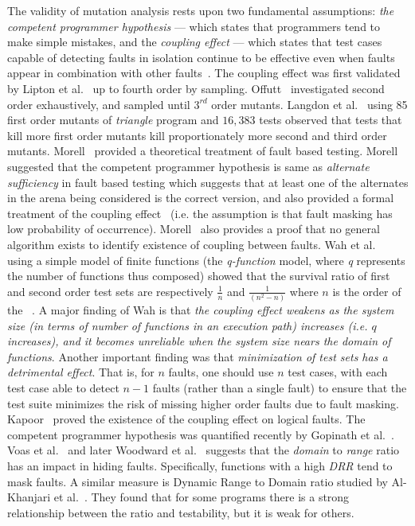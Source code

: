 \documentclass[preprint,nonatbib]{sigplanconf}\usepackage[]{graphicx}\usepackage[]{color}
\begin{document}
The validity of mutation analysis rests upon two fundamental assumptions:
\emph{the competent programmer hypothesis} --- which states that programmers tend
to make simple mistakes, and the \emph{coupling effect} --- which states that test
cases capable of detecting faults in isolation continue to be effective even
when faults appear in combination with other faults~\cite{demillo1978hints}.
The coupling effect was first validated by Lipton et
al.~\cite{lipton1978the,demillo1978hints} up to fourth order by sampling.
Offutt~\cite{offutt1989thecoupling,offutt1992investigations} investigated second
order exhaustively, and sampled until $3^{rd}$ order mutants.
Langdon et al.~\cite{langdon2010efficient} using 85 first order mutants of
\emph{triangle} program and $16,383$ tests observed that tests that kill more
first order mutants kill proportionately more second and third order mutants.
Morell~\cite{morell1990atheory} provided a theoretical treatment
of fault based testing. Morell suggested that the competent programmer
hypothesis is same as \emph{alternate sufficiency} in fault based testing
which suggests that at least one of the alternates in the arena being considered
is the correct version, and also provided a formal treatment of the
coupling effect~\cite{morell1987amodel}
(i.e. the assumption is that fault masking has low probability of occurrence).
Morell~\cite{morell1983a} also provides a proof that no general algorithm exists
to identify existence of coupling between faults.
Wah et al.~\cite{wah1995fault,wah2000atheoretical,wah2001theoretical,wah2003ananalysis} using a
simple model of finite functions (the \emph{q-function} model, where \emph{q}
represents the number of functions thus composed) showed that the survival ratio of first and
second order test sets are respectively $\frac{1}{n}$ and $\frac{1}{(n^2 - n)}$
where $n$ is the order of the \finput~\cite{jia2011analysis}.
A major finding of Wah is that \emph{the coupling effect weakens as the system
size (in terms of number of functions in an execution path) increases (i.e. $q$ increases),
and it becomes unreliable when the system size nears the domain of functions}.
Another important finding was that \emph{minimization of test sets has a
detrimental effect}. That is, for $n$ faults, one should use $n$ test cases, with
each test case able to detect $n-1$ faults (rather than a single fault) to
ensure that the test suite minimizes the risk of missing higher order faults due
to fault masking.
Kapoor~\cite{kapoor2006formal} proved the existence of the coupling effect on
logical faults.
The competent programmer hypothesis was quantified recently by Gopinath et al.~\cite{gopinath2014mutations}.
Voas et al.~\cite{voas1993semantic} and later Woodward et al.~\cite{woodward2000testability}
suggests that the \emph{domain} to
\emph{range} ratio has an impact in hiding faults. Specifically, functions
with a high \emph{DRR} tend to mask faults. A similar measure is Dynamic Range to Domain
ratio studied by Al-Khanjari et al.~\cite{alkhanjari2003investigating}. They
found that for some programs there is a strong relationship between the
ratio and testability, but it is weak for others.
\end{document}
